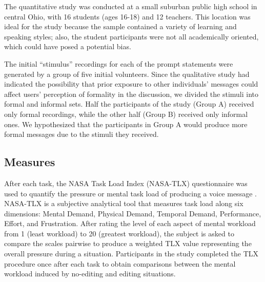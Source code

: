 
The quantitative study was conducted at a small suburban public high school in central Ohio, with 16 students (ages 16-18) and 12 teachers.
This location was ideal for the study because the sample contained a variety of learning and speaking styles; also, the student participants were not all academically oriented, which could have posed a potential bias.


The initial ``stimulus'' recordings for each of the prompt statements were generated by a group of five initial volunteers. 
Since the qualitative study had indicated the possibility that prior exposure to other individuals' messages could affect users' perception of formality in the discussion, we divided the stimuli into formal and informal sets. 
Half the participants of the study (Group A) received only formal recordings, while the other half (Group B) received only informal ones.
We hypothesized that the participants in Group A would produce more formal messages due to the stimuli they received.

\subsection{Measures}

After each task, the NASA Task Load Index (NASA-TLX) questionnaire was used to quantify the pressure or mental task load of producing a voice message \cite{nasatlx}. 
NASA-TLX is a subjective analytical tool that measures task load along six dimensions: Mental Demand, Physical Demand, Temporal Demand, Performance, Effort, and Frustration. 
After rating the level of each aspect of mental workload from 1 (least workload) to 20 (greatest workload), the subject is asked to compare the scales pairwise to produce a weighted TLX value representing the overall pressure during a situation. 
Participants in the study completed the TLX procedure once after each task to obtain comparisons between the mental workload induced by no-editing and editing situations.

